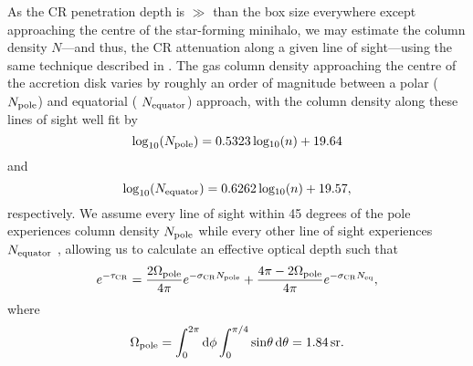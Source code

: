 As the CR penetration depth is $\gg$ than the box size everywhere except approaching the centre of the star-forming minihalo, we may estimate the column density $N$---and thus, the CR attenuation along a given line of sight---using the same technique described in \citet{Hummeletal2015}. 
The gas column density approaching the centre of the accretion disk varies by roughly an order of magnitude between a polar ($N_{\rm \small pole}$) and equatorial ( $N_{\rm equator}$) approach, with the column density  along these lines of sight well fit by
\begin{equation}
{\rm log}_{10}(N_{\rm \small pole}) = 0.5323\, {\rm log_{10}}(n) + 19.64
\end{equation}
and
\begin{equation}
{\rm log}_{10}(N_{\rm \small equator}) = 0.6262\, {\rm log_{10}}(n) + 19.57, 
\end{equation}
respectively. We assume every line of sight within 45 degrees of the pole experiences column density $N_{\rm \small pole}$ while every other line of sight experiences $N_{\rm \small equator}$ \citep{Hosokawaetal2011}, allowing us to calculate an effective optical depth such that
\begin{equation}
e^{-\tau_{\rm \small CR}} = \frac{2 \Omega_{\rm \small pole}}{4\pi} e^{-\sigma_{\rm \small CR} N_{\rm \small pole}} + \frac{4\pi - 2 \Omega_{\rm \small pole}}{4\pi} e^{-\sigma_{\rm \small CR} N_{\rm \small eq}},
\end{equation}
where
\begin{equation}
\Omega_{\rm \small pole} = \int_0^{2\pi}{\rm d}\phi \int_0^{\pi/4}{\rm sin}\theta \,{\rm d}\theta = 1.84\,{\rm sr}.
\end{equation}